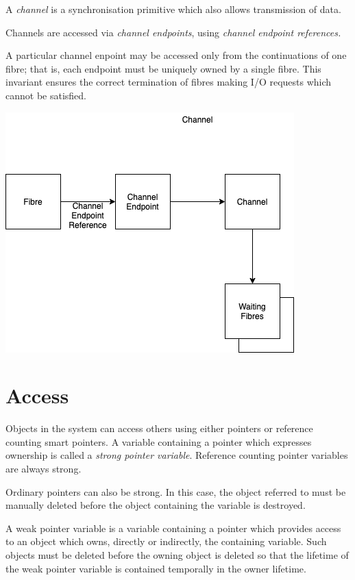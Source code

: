 \documentclass[oneside]{book}
\begin{document}
A {\em channel} is a synchronisation primitive which also allows transmission
of data.

Channels are accessed via {\em channel endpoints}, using {\em channel endpoint references.}

A particular channel enpoint may be accessed only from the continuations
of one fibre; that is, each endpoint must be uniquely owned by a single
fibre. This invariant ensures the correct termination of fibres
making I/O requests which cannot be satisfied. 

\includegraphics{../src/tex/channel.png}

\chapter{Access}
Objects in the system can access others using either pointers
or reference counting smart pointers. A variable containing a pointer
which expresses ownership is called a {\em strong pointer variable}.
Reference counting pointer variables are always strong.

Ordinary pointers can also be strong. In this case, the object referred
to must be manually deleted before the object containing the variable
is destroyed.

A weak pointer variable is a variable containing a pointer which provides
access to an object which owns, directly or indirectly, the containing
variable. Such objects must be deleted before the owning object is deleted
so that the lifetime of the weak pointer variable is contained temporally
in the owner lifetime.
\end{document}
